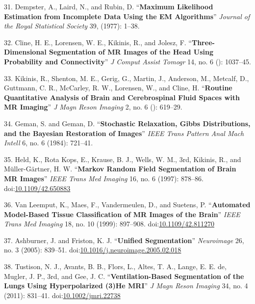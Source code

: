 \documentclass[11pt,]{article}
\begin{document}
\hypertarget{ref-Dempster:1977aa}{}
31. Dempster, A., Laird, N., and Rubin, D. ``\textbf{Maximum Likelihood
Estimation from Incomplete Data Using the EM Algorithms}'' \emph{Journal
of the Royal Statistical Society} 39, (1977): 1--38.

\hypertarget{ref-Cline:1990aa}{}
32. Cline, H. E., Lorensen, W. E., Kikinis, R., and Jolesz, F.
``\textbf{Three-Dimensional Segmentation of MR Images of the Head Using
Probability and Connectivity}'' \emph{J Comput Assist Tomogr} 14, no. 6
(): 1037--45.

\hypertarget{ref-Kikinis:1992aa}{}
33. Kikinis, R., Shenton, M. E., Gerig, G., Martin, J., Anderson, M.,
Metcalf, D., Guttmann, C. R., McCarley, R. W., Lorensen, W., and Cline,
H. ``\textbf{Routine Quantitative Analysis of Brain and Cerebrospinal
Fluid Spaces with MR Imaging}'' \emph{J Magn Reson Imaging} 2, no. 6 ():
619--29.

\hypertarget{ref-Geman:1984aa}{}
34. Geman, S. and Geman, D. ``\textbf{Stochastic Relaxation, Gibbs
Distributions, and the Bayesian Restoration of Images}'' \emph{IEEE
Trans Pattern Anal Mach Intell} 6, no. 6 (1984): 721--41.

\hypertarget{ref-Held:1997aa}{}
35. Held, K., Rota Kops, E., Krause, B. J., Wells, W. M., 3rd, Kikinis,
R., and Müller-Gärtner, H. W. ``\textbf{Markov Random Field Segmentation
of Brain MR Images}'' \emph{IEEE Trans Med Imaging} 16, no. 6 (1997):
878--86. doi:\href{https://doi.org/10.1109/42.650883}{10.1109/42.650883}

\hypertarget{ref-Van-Leemput:1999aa}{}
36. Van Leemput, K., Maes, F., Vandermeulen, D., and Suetens, P.
``\textbf{Automated Model-Based Tissue Classification of MR Images of
the Brain}'' \emph{IEEE Trans Med Imaging} 18, no. 10 (1999): 897--908.
doi:\href{https://doi.org/10.1109/42.811270}{10.1109/42.811270}

\hypertarget{ref-Ashburner:2005aa}{}
37. Ashburner, J. and Friston, K. J. ``\textbf{Unified Segmentation}''
\emph{Neuroimage} 26, no. 3 (2005): 839--51.
doi:\href{https://doi.org/10.1016/j.neuroimage.2005.02.018}{10.1016/j.neuroimage.2005.02.018}

\hypertarget{ref-Tustison:2011aa}{}
38. Tustison, N. J., Avants, B. B., Flors, L., Altes, T. A., Lange, E.
E. de, Mugler, J. P., 3rd, and Gee, J. C. ``\textbf{Ventilation-Based
Segmentation of the Lungs Using Hyperpolarized (3)He MRI}'' \emph{J Magn
Reson Imaging} 34, no. 4 (2011): 831--41.
doi:\href{https://doi.org/10.1002/jmri.22738}{10.1002/jmri.22738}
\end{document}
